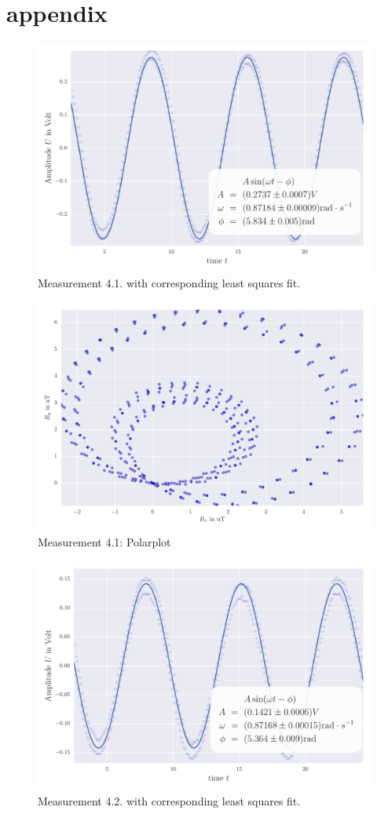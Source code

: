 \section{appendix}
\label{sec:appendix}
\begin{figure}[H]
    \centering
    \includegraphics[width=0.7\linewidth]{analysis/figures/fit4_1}
    \caption{Measurement 4.1. with corresponding least squares fit.}
    \label{fig:4_1_plot}
\end{figure}
\begin{figure}[H]
    \centering
    \includegraphics[width=0.7\linewidth]{analysis/figures/polar4_1}
    \caption{Measurement 4.1: Polarplot}
    \label{fig:4_1_polar}
\end{figure}


\begin{figure}[H]
    \centering
    \includegraphics[width=0.7\linewidth]{analysis/figures/fit4_2}
    \caption{Measurement 4.2. with corresponding least squares fit.}
    \label{fig:4_2_plot}
\end{figure}

